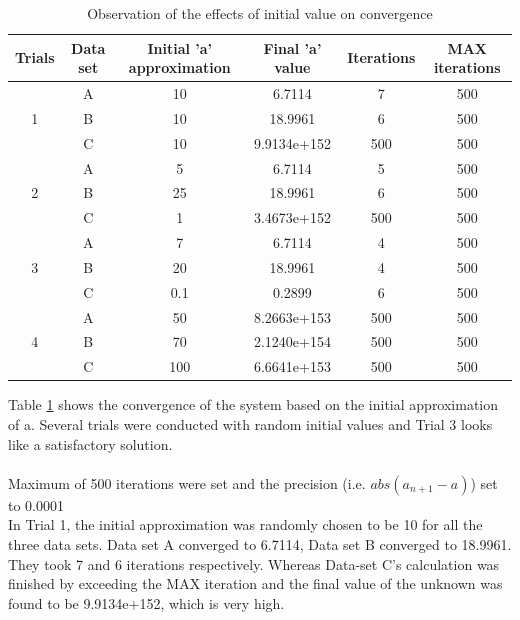 \documentclass{article}
\begin{document}
\renewcommand{\arraystretch}{2} %
\begin{table}[t]
\begin{center}
\begin{tabular}{ |c|c|c|c|c|c|}
\hline
Trials & Data set & Initial 'a' approximation & Final 'a' value & Iterations &MAX iterations \\
\hline 
\multirow{3}{*}{1} & A  & 10 & 6.7114 & 7 & 500\\ \cline{2-6}
& B  & 10 & 18.9961 & 6 & 500 \\ \cline{2-6}
& C  & 10 & 9.9134e+152 & 500 & 500 \\
\hline
\multirow{3}{*}{2} & A  & 5 & 6.7114 & 5 & 500\\ \cline{2-6}
& B  & 25 & 18.9961 & 6 & 500 \\ \cline{2-6}
& C  & 1 & 3.4673e+152 & 500 & 500 \\
\hline
\rowcolor{green!10}
\multirow{3}{*}{3} & A  & 7 & 6.7114 & 4 & 500\\ \cline{2-6} \rowcolor{green!10} 
3& B  & 20 & 18.9961 & 4 & 500 \\  \cline{2-6} \rowcolor{green!10}
& C  & 0.1 & 0.2899 & 6 & 500 \\
\multirow{3}{*}{4} & A  & 50 & 8.2663e+153 & 500 & 500\\ \cline{2-6}
& B  & 70 & 2.1240e+154 & 500 & 500 \\ \cline{2-6}
& C  & 100 & 6.6641e+153 & 500 & 500 \\
\hline
\end{tabular}
\end{center}
\caption{Observation of the effects of initial value on convergence}
\label{table:res}
\end{table}
\renewcommand{\arraystretch}{1} %

\noindent
Table \ref{table:res} shows the convergence of the system based on the initial approximation of a. Several trials were conducted with random initial values and Trial 3 looks like a satisfactory solution. \\
\\
Maximum of 500 iterations were set and the precision (i.e. $abs(a_{n+1} - a)$) set to  0.0001 \\
In Trial 1, the initial approximation was randomly chosen to be 10 for all the three data sets. Data set A converged to 6.7114, Data set B converged to 18.9961. They took 7 and 6 iterations respectively. Whereas Data-set C's calculation was finished by exceeding the MAX iteration and the final value of the unknown was found to be 9.9134e+152, which is very high. 
\newpage
\end{document}
